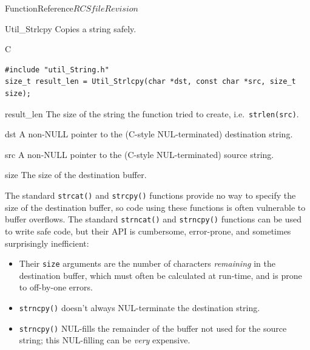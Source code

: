 \begin{cactuspart}{FunctionReference}{$RCSfile$}{$Revision$}

\begin{FunctionDescription}{Util\_Strlcpy}
\label{Util-Strlcpy}
Copies a string safely.

\begin{SynopsisSection}
\begin{Synopsis}{C}
\begin{verbatim}
#include "util_String.h"
size_t result_len = Util_Strlcpy(char *dst, const char *src, size_t size);
\end{verbatim}
\end{Synopsis}
\end{SynopsisSection}

\begin{ResultSection}
\begin{Result}{result\_len}
The size of the string the function tried to create, i.e.\
\verb|strlen(src)|.
\end{Result}
\end{ResultSection}

\begin{ParameterSection}
\begin{Parameter}{dst}
A non-NULL pointer to the (C-style NUL-terminated) destination string.
\end{Parameter}
\begin{Parameter}{src}
A non-NULL pointer to the (C-style NUL-terminated) source string.
\end{Parameter}
\begin{Parameter}{size}
The size of the destination buffer.
\end{Parameter}
\end{ParameterSection}

\begin{Discussion}
The standard \verb|strcat()| and \verb|strcpy()| functions provide
no way to specify the size of the destination buffer, so code using
these functions is often vulnerable to buffer overflows.  The standard
\verb|strncat()| and \verb|strncpy()| functions can be used to write
safe code, but their API is cumbersome, error-prone, and sometimes
surprisingly inefficient:
\begin{itemize}
\item	Their \verb|size| arguments are the number of characters
	{\em remaining\/} in the destination buffer, which must
	often be calculated at run-time, and is prone to off-by-one
	errors.
\item	\verb|strncpy()| doesn't always NUL-terminate the destination string.
\item	\verb|strncpy()| NUL-fills the remainder of the buffer not
	used for the source string; this NUL-filling can be {\em very\/}
	expensive.
\end{itemize}


\end{Discussion}
\end{FunctionDescription}
\end{cactuspart}
